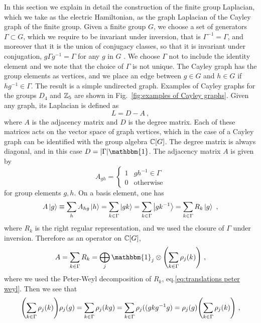 In this section we explain in detail the construction of the finite group Laplacian, which we take as the electric Hamiltonian, as the graph Laplacian of the Cayley graph of the finite group.
Given a finite group $G$, we choose a set of generators $\Gamma \subset G$, which we require to be invariant under inversion, that is $\Gamma^{-1}=\Gamma$, and moreover that it is the union of conjugacy classes, so that it is invariant under conjugation, $g \Gamma g^{-1}=\Gamma$ for any $g$ in $G$ \cite{spectralgraphtheory}.
We choose $\Gamma$ not to include the identity element and we note that the choice of $\Gamma$ is not unique.
The Cayley graph has the group elements as vertices, and we place an edge between $g \in G$ and $h \in G$ if $h g^{-1} \in \Gamma$.
The result is a simple undirected graph.
Examples of Cayley graphs for the groups $D_4$ and $\mathbb{Z}_5$ are shown in Fig.~\ref{fig:examples of Cayley graphs}.
Given any graph, its Laplacian is defined as \cite{spectralgraphtheory}
\begin{equation}
    L = D-A \ ,
\end{equation}
where $A$ is the adjacency matrix and $D$ is the degree matrix.
Each of these matrices acts on the vector space of graph vertices, which in the case of a Cayley graph can be identified with the group algebra $\mathbb{C}[G]$.
The degree matrix is always diagonal, and in this case $D=\abs{\Gamma} \mathbbm{1}$.
The adjacency matrix $A$ is given by
\begin{equation}
    A_{gh} = \begin{cases}1 & g h^{-1} \in \Gamma\\ 0 & \mathrm{otherwise}\end{cases}
\end{equation}
for group elements $g,h$.
On a basis element, one has
\begin{equation}
    A \ket{g} \equiv \sum_h A_{hg} \ket{h} = \sum_{k \in \Gamma} \ket{gk} = \sum_{k \in \Gamma} \ket{gk^{-1}} = \sum_{k \in \Gamma} R_k \ket{g} \ ,
\end{equation}
where $R_k$ is the right regular representation, and we used the closure of $\Gamma$ under inversion.
Therefore as an operator on $\mathbb{C}[G]$,
\begin{equation}
    A = \sum_{k \in \Gamma} R_k = \bigoplus_j \mathbbm{1}_j \otimes \pqty{\sum_{k \in \Gamma} \rho_j(k)} \ ,
\end{equation}
where we used the Peter-Weyl decomposition of $R_k$, eq.\eqref{eq:translations peter weyl}.
Then we see that
\begin{equation}
    \pqty{\sum_{k \in \Gamma} \rho_j(k)} \rho_j(g) = \sum_{k \in \Gamma} \rho_j(kg) = \sum_{k \in \Gamma} \rho_j((g k g^{-1} g) = \rho_j(g) \pqty{\sum_{k \in \Gamma} \rho_j(k)} \ ,
\end{equation}
